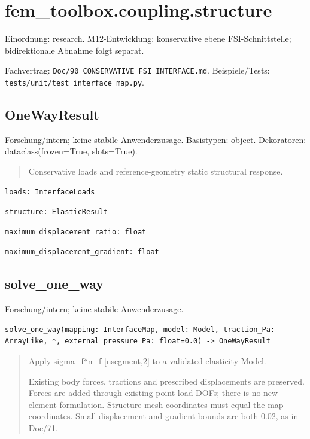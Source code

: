 \section{fem\_toolbox.coupling.structure}
Einordnung: research. M12-Entwicklung: konservative ebene FSI-Schnittstelle; bidirektionale Abnahme folgt separat.
\par Fachvertrag: \nolinkurl{Doc/90_CONSERVATIVE_FSI_INTERFACE.md}. Beispiele/Tests:
\nolinkurl{tests/unit/test_interface_map.py}.
\subsection{OneWayResult}
Forschung/intern; keine stabile Anwenderzusage.
Basistypen: object. Dekoratoren: dataclass(frozen=True, slots=True).
\begin{quote}
Conservative loads and reference-geometry static structural response.
\end{quote}
\begin{lstlisting}
loads: InterfaceLoads
\end{lstlisting}
\begin{lstlisting}
structure: ElasticResult
\end{lstlisting}
\begin{lstlisting}
maximum_displacement_ratio: float
\end{lstlisting}
\begin{lstlisting}
maximum_displacement_gradient: float
\end{lstlisting}
\subsection{solve\_one\_way}
Forschung/intern; keine stabile Anwenderzusage.
\begin{lstlisting}
solve_one_way(mapping: InterfaceMap, model: Model, traction_Pa: ArrayLike, *, external_pressure_Pa: float=0.0) -> OneWayResult
\end{lstlisting}
\begin{quote}
Apply sigma\_f*n\_f [nsegment,2] to a validated elasticity Model.\par Existing body forces, tractions and prescribed displacements are preserved. Forces are added through existing point-load DOFs; there is no new element formulation. Structure mesh coordinates must equal the map coordinates. Small-displacement and gradient bounds are both 0.02, as in Doc/71.
\end{quote}
